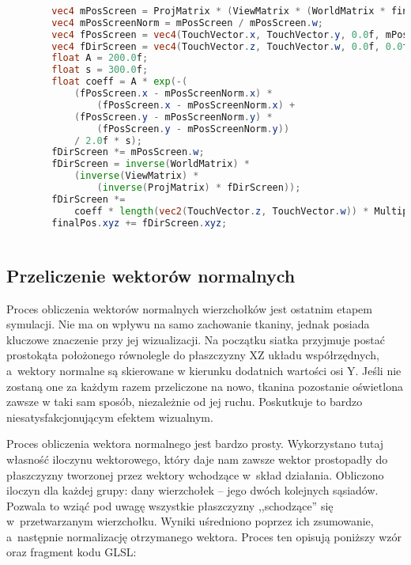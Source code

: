 		\begin{lstlisting}[language=GLSL,caption={Obliczenie reakcji tkaniny na dotyk ekranu.},label={lst_5_4}]
		
		vec4 mPosScreen = ProjMatrix * (ViewMatrix * (WorldMatrix * finalPos));
		vec4 mPosScreenNorm = mPosScreen / mPosScreen.w;
		vec4 fPosScreen = vec4(TouchVector.x, TouchVector.y, 0.0f, mPosScreenNorm.w);
		vec4 fDirScreen = vec4(TouchVector.z, TouchVector.w, 0.0f, 0.0f);
		float A = 200.0f;
		float s = 300.0f;
		float coeff = A * exp(-(
			(fPosScreen.x - mPosScreenNorm.x) * 
				(fPosScreen.x - mPosScreenNorm.x) +
			(fPosScreen.y - mPosScreenNorm.y) * 
				(fPosScreen.y - mPosScreenNorm.y)) 
			/ 2.0f * s);
		fDirScreen *= mPosScreen.w;
		fDirScreen = inverse(WorldMatrix) * 
			(inverse(ViewMatrix) * 
				(inverse(ProjMatrix) * fDirScreen));
		fDirScreen *= 
			coeff * length(vec2(TouchVector.z, TouchVector.w)) * Multipliers.x;
		finalPos.xyz += fDirScreen.xyz;
		
		\end{lstlisting}
			
		\subsection{Przeliczenie wektorów normalnych}
		\label{t:symulacja:dzialanie:normalne}
			
		
		Proces obliczenia wektorów normalnych wierzchołków jest ostatnim etapem symulacji. Nie ma on wpływu na samo zachowanie tkaniny, jednak posiada kluczowe znaczenie przy jej wizualizacji. Na początku siatka przyjmuje postać prostokąta położonego równolegle do płaszczyzny XZ układu współrzędnych, a~wektory normalne są skierowane w kierunku dodatnich wartości osi Y. Jeśli nie zostaną one za każdym razem przeliczone na nowo, tkanina pozostanie oświetlona zawsze w taki sam sposób, niezależnie od jej ruchu. Poskutkuje to bardzo niesatysfakcjonującym efektem wizualnym.
		
		Proces obliczenia wektora normalnego jest bardzo prosty. Wykorzystano tutaj własność iloczynu wektorowego, który daje nam zawsze wektor prostopadły do płaszczyzny tworzonej przez wektory wchodzące w~skład działania. Obliczono iloczyn dla każdej grupy: dany wierzchołek -- jego dwóch kolejnych sąsiadów. Pozwala to wziąć pod uwagę wszystkie płaszczyzny ,,schodzące'' się w~przetwarzanym wierzchołku. Wyniki uśredniono poprzez ich zsumowanie, a~następnie normalizację otrzymanego wektora. Proces ten opisują poniższy wzór oraz fragment kodu GLSL:
		
